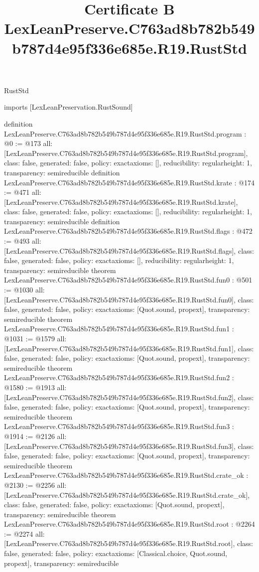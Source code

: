 \begin{lexlean}{RustStd}
\title{Certificate B LexLeanPreserve.C763ad8b782b549b787d4e95f336e685e.R19.RustStd}
\begin{coremodule}
imports [LexLeanPreservation.RustSound]

definition LexLeanPreserve.C763ad8b782b549b787d4e95f336e685e.R19.RustStd.program : @0 := @173 {
  all: [LexLeanPreserve.C763ad8b782b549b787d4e95f336e685e.R19.RustStd.program],
  class: false,
  generated: false,
  policy: exact{axioms: []},
  reducibility: regular{height: 1},
  transparency: semireducible
}
definition LexLeanPreserve.C763ad8b782b549b787d4e95f336e685e.R19.RustStd.krate : @174 := @471 {
  all: [LexLeanPreserve.C763ad8b782b549b787d4e95f336e685e.R19.RustStd.krate],
  class: false,
  generated: false,
  policy: exact{axioms: []},
  reducibility: regular{height: 1},
  transparency: semireducible
}
definition LexLeanPreserve.C763ad8b782b549b787d4e95f336e685e.R19.RustStd.flags : @472 := @493 {
  all: [LexLeanPreserve.C763ad8b782b549b787d4e95f336e685e.R19.RustStd.flags],
  class: false,
  generated: false,
  policy: exact{axioms: []},
  reducibility: regular{height: 1},
  transparency: semireducible
}
theorem LexLeanPreserve.C763ad8b782b549b787d4e95f336e685e.R19.RustStd.fun0 : @501 := @1030 {
  all: [LexLeanPreserve.C763ad8b782b549b787d4e95f336e685e.R19.RustStd.fun0],
  class: false,
  generated: false,
  policy: exact{axioms: [Quot.sound, propext]},
  transparency: semireducible
}
theorem LexLeanPreserve.C763ad8b782b549b787d4e95f336e685e.R19.RustStd.fun1 : @1031 := @1579 {
  all: [LexLeanPreserve.C763ad8b782b549b787d4e95f336e685e.R19.RustStd.fun1],
  class: false,
  generated: false,
  policy: exact{axioms: [Quot.sound, propext]},
  transparency: semireducible
}
theorem LexLeanPreserve.C763ad8b782b549b787d4e95f336e685e.R19.RustStd.fun2 : @1580 := @1913 {
  all: [LexLeanPreserve.C763ad8b782b549b787d4e95f336e685e.R19.RustStd.fun2],
  class: false,
  generated: false,
  policy: exact{axioms: [Quot.sound, propext]},
  transparency: semireducible
}
theorem LexLeanPreserve.C763ad8b782b549b787d4e95f336e685e.R19.RustStd.fun3 : @1914 := @2126 {
  all: [LexLeanPreserve.C763ad8b782b549b787d4e95f336e685e.R19.RustStd.fun3],
  class: false,
  generated: false,
  policy: exact{axioms: [Quot.sound, propext]},
  transparency: semireducible
}
theorem LexLeanPreserve.C763ad8b782b549b787d4e95f336e685e.R19.RustStd.crate_ok : @2130 := @2256 {
  all: [LexLeanPreserve.C763ad8b782b549b787d4e95f336e685e.R19.RustStd.crate_ok],
  class: false,
  generated: false,
  policy: exact{axioms: [Quot.sound, propext]},
  transparency: semireducible
}
theorem LexLeanPreserve.C763ad8b782b549b787d4e95f336e685e.R19.RustStd.root : @2264 := @2274 {
  all: [LexLeanPreserve.C763ad8b782b549b787d4e95f336e685e.R19.RustStd.root],
  class: false,
  generated: false,
  policy: exact{axioms: [Classical.choice, Quot.sound, propext]},
  transparency: semireducible
}


\end{coremodule}
\end{lexlean}
